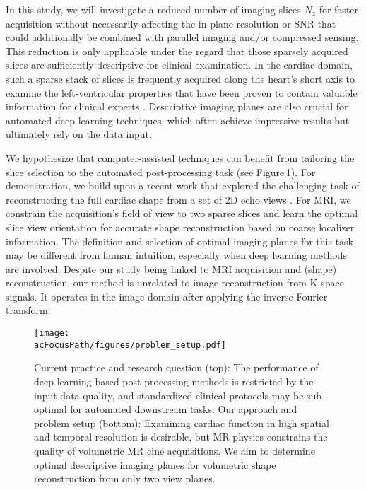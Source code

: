     In this study, we will investigate a reduced number of imaging slices $N_z$ for faster acquisition without necessarily affecting the in-plane resolution or SNR that could additionally be combined with parallel imaging and/or compressed sensing.
    This reduction is only applicable under the regard that those sparsely acquired slices are sufficiently descriptive for clinical examination.
    In the cardiac domain, such a sparse stack of slices is frequently acquired along the heart's short axis to examine the left-ventricular properties that have been proven to contain valuable information for clinical experts \citep{american2002standardized}. Descriptive imaging planes are also crucial for automated deep learning techniques, which often achieve impressive results but ultimately rely on the data input.

    We hypothesize that computer-assisted techniques can benefit from tailoring the slice selection to the automated post-processing task (see Figure\,\ref{fig:problem_setup}).
    For demonstration, we build upon a recent work that explored the challenging task of reconstructing the full cardiac shape from a set of 2D echo views \citep{stojanovski2022efficient}. For MRI, we constrain the acquisition's field of view to two sparse slices and learn the optimal slice view orientation for accurate shape reconstruction based on coarse localizer information.
    The definition and selection of optimal imaging planes \citep{watkins2013cardiovascular,american2002standardized,ismail2022cardiac} for this task may be different from human intuition, especially when deep learning methods are involved. Despite our study being linked to MRI acquisition and (shape) reconstruction, our method is unrelated to image reconstruction from K-space signals. It operates in the image domain after applying the inverse Fourier transform.


    \begin{figure}
        \texttt{[image: \\acFocusPath/figures/problem\_setup.pdf]}
        \caption{Current practice and research question (top): The performance of deep learning-based post-processing methods is restricted by the input data quality, and standardized clinical protocols may be sub-optimal for automated downstream tasks. Our approach and problem setup (bottom): Examining cardiac function in high spatial and temporal resolution is desirable, but MR physics constrains the quality of volumetric MR cine acquisitions. We aim to determine optimal descriptive imaging planes for volumetric shape reconstruction from only two view planes.}
    \label{fig:problem_setup}
    \end{figure}


